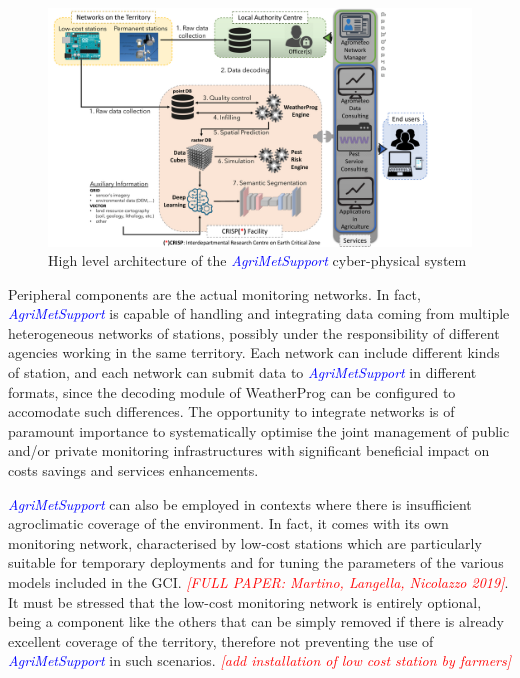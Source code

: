 \documentclass[authoryear,preprint,review,12pt]{elsarticle}
\newcommand{\note}[1]{\emph{\textcolor{red}{#1}}}
\newcommand{\update}[1]{\emph{\textcolor{blue}{#1}}}
\newcommand{\gci}{\update{AgriMetSupport}\xspace}
\begin{document}
\begin{figure}
	\centering
	\includegraphics[scale=.5]{figures/fullSystem_GCI.pdf}
	\caption{High level architecture of the \gci cyber-physical system}
	\label{cyberPhysicalSystemFig}
\end{figure}

Peripheral components are the actual monitoring networks.
In fact, \gci is capable of handling and integrating data coming from multiple heterogeneous networks of stations, possibly under the responsibility of different agencies working in the same territory.
Each network can include different kinds of station, and each network can submit data to \gci in different formats, since the decoding module of WeatherProg can be configured to accomodate such differences.
The opportunity to integrate networks is of paramount importance to systematically optimise the joint management of public and/or private monitoring infrastructures with significant beneficial impact on costs savings and services enhancements.

\gci can also be employed in contexts where there is insufficient agroclimatic coverage of the environment.
In fact, it comes with its own monitoring network, characterised by low-cost stations which are particularly suitable for temporary deployments and for tuning the parameters of the various models included in the GCI.  \note{[FULL PAPER: Martino, Langella, Nicolazzo 2019]}.
It must be stressed that the low-cost monitoring network is entirely optional, being a component like the others that can be simply removed if there is already excellent coverage of the territory, therefore not preventing the use of \gci in such scenarios. \note{[add installation of low cost station by farmers]}
\end{document}
